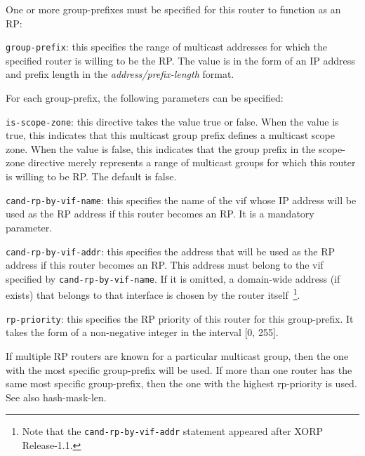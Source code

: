 \begin{description}
  One or more group-prefixes must be specified for this router
  to function as an RP:
\begin{description}
\item{\tt group-prefix}: this specifies the range of multicast
  addresses for which the specified router is willing to be the RP.
  The value is in the form of an IP address and prefix length in the
  {\it address/prefix-length} format.  

  For each {\stt group-prefix}, the following parameters can be
  specified:
\begin{description}
\item{\tt is-scope-zone}: this directive takes the value {\stt true}
  or {\stt false}.  When the value is {\stt true}, this indicates that
  this multicast group prefix defines a multicast scope zone.  When
  the value is {\stt false}, this indicates that the group prefix in
  the {\stt scope-zone} directive merely represents a range of
  multicast groups for which this router is willing to be RP.  The
  default is {\stt false}.
\item{\tt cand-rp-by-vif-name}: this specifies the name of the {\stt
  vif} whose IP address will be used as the RP address if this router
  becomes an RP.  It is a mandatory parameter.
\item{\tt cand-rp-by-vif-addr}: this specifies the address that will be used
  as the RP address if this router becomes an RP.
  This address must belong to the vif
  specified by {\tt cand-rp-by-vif-name}. If it is omitted, a domain-wide
  address (if exists) that belongs to that interface is chosen by the router
  itself~\footnote{Note that the {\tt cand-rp-by-vif-addr} statement
  appeared after XORP Release-1.1.}.
\item{\tt rp-priority}: this specifies the RP priority of this router
  for this {\stt group-prefix}.  It takes the form of a non-negative
  integer in the interval [0, 255].

  If multiple RP routers are known for a particular multicast group,
  then the one with the most specific {\stt group-prefix} will be
  used.  If more than one router has the same most specific {\stt
  group-prefix}, then the one with the highest {\stt rp-priority} is
  used.  See also {\stt hash-mask-len}.


\end{description}
\end{description}
\end{description}
